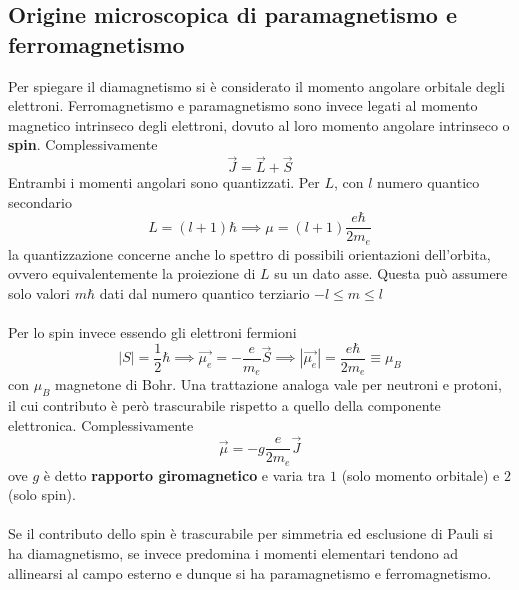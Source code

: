 \subsection{Origine microscopica di paramagnetismo e ferromagnetismo}
Per spiegare il diamagnetismo si è considerato il momento angolare orbitale degli elettroni. Ferromagnetismo e paramagnetismo sono invece legati al momento magnetico intrinseco degli elettroni, dovuto al loro momento angolare intrinseco o \textbf{spin}. Complessivamente 
\[\vec{J} = \vec{L} + \vec{S}\]
Entrambi i momenti angolari sono quantizzati. Per $L$, con $l$ numero quantico secondario
\[L = (l + 1) \hbar \implies \mu = (l+1) \frac{e \hbar}{2 m_e}\]
la quantizzazione concerne anche lo spettro di possibili orientazioni dell'orbita, ovvero equivalentemente la proiezione di $L$ su un dato asse. Questa può assumere solo valori $m \hbar$ dati dal numero quantico terziario $-l \leq m \leq l$
\\~\\
Per lo spin invece essendo gli elettroni fermioni
\[|S| = \frac{1}{2}\hbar \implies \vec{\mu_e} = - \frac{e}{m_e} \vec{S} \implies |\vec{\mu_e}| = \frac{e \hbar}{2 m_e} \equiv \mu_B\]
con $\mu_B$ magnetone di Bohr. Una trattazione analoga vale per neutroni e protoni, il cui contributo è però trascurabile rispetto a quello della componente elettronica. Complessivamente
\[\vec{\mu} = - g \frac{e}{2 m_e} \vec{J}\]
ove $g$ è detto \textbf{rapporto giromagnetico} e varia tra $1$ (solo momento orbitale) e $2$ (solo spin).
\\~\\
Se il contributo dello spin è trascurabile per simmetria ed esclusione di Pauli si ha diamagnetismo, se invece predomina i momenti elementari tendono ad allinearsi al campo esterno e dunque si ha paramagnetismo e ferromagnetismo.

